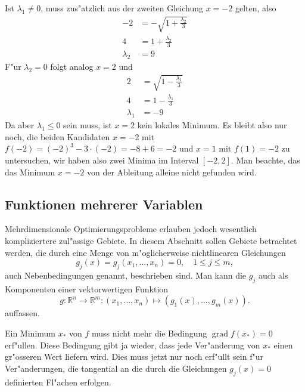 Ist $\lambda_1\ne 0$, muss zus"atzlich aus der zweiten
Gleichung $x=-2$ gelten, also
\begin{align*}
-2&=-\sqrt{1+\frac{\lambda_2}3}\\
4&=1+\frac{\lambda_2}3\\
\lambda_2&=9
\end{align*}
F"ur $\lambda_2=0$  folgt analog $x=2$ und
\begin{align*}
2&=\sqrt{1-\frac{\lambda_1}3}\\
4&=1-\frac{\lambda_1}3\\
\lambda_1&=-9
\end{align*}
Da aber $\lambda_1\le 0$ sein muss, ist $x=2$ kein lokales Minimum.
Es bleibt also nur noch, die beiden Kandidaten $x=-2$
mit $f(-2)=(-2)^3-3\cdot(-2)=-8+6=-2$
und $x=1$ mit $f(1)=-2$
zu untersuchen, wir haben also zwei Minima im Interval $[-2,2]$.
Man beachte, das das Minimum $x=-2$ von der Ableitung alleine nicht
gefunden wird.

\subsection{Funktionen mehrerer Variablen}
Mehrdimensionale Optimierungsprobleme erlauben jedoch
wesentlich kompliziertere zul"assige Gebiete. In diesem Abschnitt
sollen Gebiete betrachtet werden, die durch
eine Menge von m"oglicherweise nichtlinearen Gleichungen
\begin{equation}
g_j(x) = g_j(x_1,\dots,x_n) = 0, \quad 1\le j\le m,
\end{equation}
auch Nebenbedingungen genannt,
beschrieben sind. Man kann die $g_j$ auch als Komponenten einer
vektorwertigen Funktion
\begin{equation}
g\colon \mathbb R^n\to \mathbb R^m:(x_1,\dots,x_n)\mapsto (g_1(x),\dots, g_m(x)).
\end{equation}
auffassen.

Ein Minimum $x_*$ von $f$ muss nicht mehr die Bedingung
$\operatorname{grad}f(x_*)=0$ erf"ullen. Diese Bedingung gibt ja
wieder, dass jede Ver"anderung von $x_*$ einen gr"osseren Wert
liefern wird. Dies muss jetzt nur noch erf"ullt sein f"ur
Ver"anderungen, die tangential an die durch die Gleichungen
$g_j(x)=0$ definierten Fl"achen erfolgen. 

